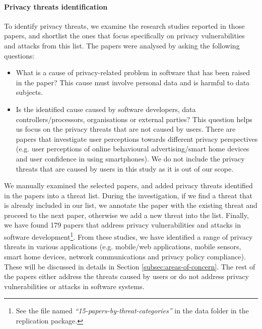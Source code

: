 \paragraph{\textbf{Privacy threats identification}}

To identify privacy threats, we examine the research studies reported in those papers, and shortlist the ones that focus specifically on privacy vulnerabilities and attacks from this list. The papers were analysed by asking the following questions:

\begin{itemize}[leftmargin=*]
	\item What is a cause of privacy-related problem in software that has been raised in the paper? This cause must involve personal data and is harmful to data subjects. %
	\item Is the identified cause caused by software developers, data controllers/processors, organisations or external parties? This question helps us focus on the privacy threats that are not caused by users. There are papers that investigate user perceptions towards different privacy perspectives (e.g. user perceptions of online behavioural advertising/smart home devices and user confidence in using smartphones). We do not include the privacy threats that are caused by users in this study as it is out of our scope.
\end{itemize}

We manually examined the selected papers, and added privacy threats identified in the papers into a threat list. During the investigation, if we find a threat that is already included in our list, we annotate the paper with the existing threat and proceed to the next paper, otherwise we add a new threat into the list. Finally, we have found 179 papers that address privacy vulnerabilities and attacks in software development\footnote{See the file named \emph{``15-papers-by-threat-categories''} in the data folder in the replication package.}. From these studies, we have identified a range of privacy threats in various applications (e.g. mobile/web applications, mobile sensors, smart home devices, network communications and privacy policy compliance). These will be discussed in details in Section \ref{subsec:areas-of-concern}. The rest of the papers either address the threats caused by users or do not address privacy vulnerabilities or attacks in software systems.

%

